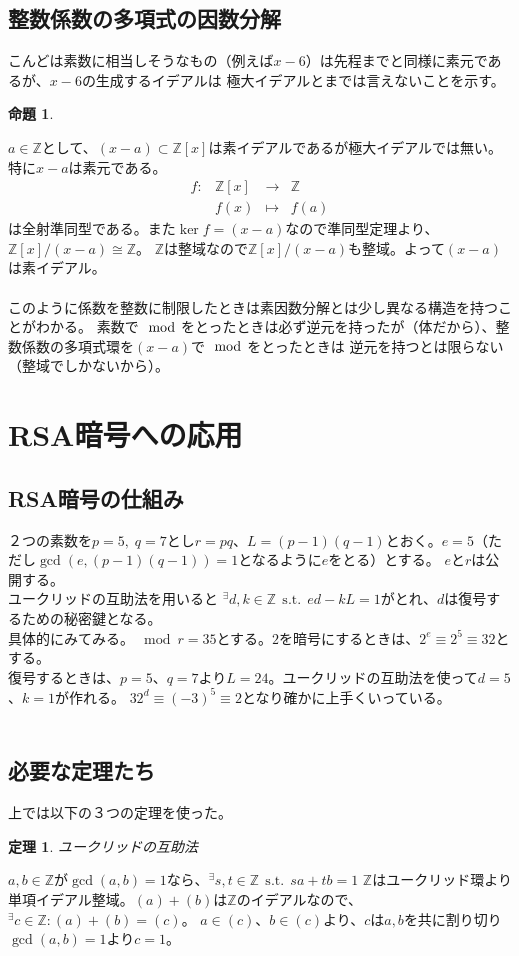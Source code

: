 \documentclass{jsarticle}
\newtheorem{thm}[definition]{定理}
\newtheorem{prop}[definition]{命題}
\begin{document}
\subsection{整数係数の多項式の因数分解}
こんどは素数に相当しそうなもの（例えば$x-6$）は先程までと同様に素元であるが、$x-6$の生成するイデアルは
極大イデアルとまでは言えないことを示す。
\begin{prop}
\end{prop}
$a\in \mathbb{Z}$として、$(x-a)\subset \mathbb{Z}[x]$は素イデアルであるが極大イデアルでは無い。特に$x-a$は素元である。
\proof
\begin{equation*}
    \begin{array}{rccc}
        f\colon &\mathbb{Z}[x] &\longrightarrow & \mathbb{Z}\\
                  &f(x) & \longmapsto    &f(a)
    \end{array}
\end{equation*}
は全射準同型である。また$\ker{f}=(x-a)$なので準同型定理より、$\mathbb{Z}[x]/(x-a)\cong \mathbb{Z}$。
$\mathbb{Z}$は整域なので$\mathbb{Z}[x]/(x-a)$も整域。よって$(x-a)$は素イデアル。\\
\\
このように係数を整数に制限したときは素因数分解とは少し異なる構造を持つことがわかる。
素数で$\mod$をとったときは必ず逆元を持ったが（体だから）、整数係数の多項式環を$(x-a)$で$\mod$をとったときは
逆元を持つとは限らない（整域でしかないから）。
\section{RSA暗号への応用}
\subsection{RSA暗号の仕組み}
２つの素数を$p=5,\; q=7$とし$r=pq$、$L=(p-1)(q-1)$とおく。$e=5$（ただし$\gcd(e,(p-1)(q-1))=1$となるように$e$をとる）とする。
$e$と$r$は公開する。\\
ユークリッドの互助法を用いると
${}^\exists d,k\in \mathbb{Z} ~~\mathrm{s.t.}~~ ed-kL=1$がとれ、$d$は復号するための秘密鍵となる。\\
具体的にみてみる。$\mod r=35$とする。$2$を暗号にするときは、$2^e\equiv 2^5\equiv 32$とする。\\
復号するときは、$p=5$、$q=7$より$L=24$。ユークリッドの互助法を使って$d=5$、$k=1$が作れる。
$32^d\equiv (-3)^5\equiv 2$となり確かに上手くいっている。\\
\\
\subsection{必要な定理たち}
上では以下の３つの定理を使った。
\begin{thm}
    ユークリッドの互助法
\end{thm}
$a,b\in \mathbb{Z}$が$\gcd(a,b)=1$なら、${}^\exists s,t\in \mathbb{Z}~~\mathrm{s.t.}~~ sa+tb=1$
\proof 
$\mathbb{Z}$はユークリッド環より単項イデアル整域。$(a)+(b)$は$\mathbb{Z}$のイデアルなので、${}^\exists c\in \mathbb{Z}\colon (a)+(b)=(c)$。
$a\in (c)$、$b\in (c)$より、$c$は$a,b$を共に割り切り$\gcd(a,b)=1$より$c=1$。
\end{document}
